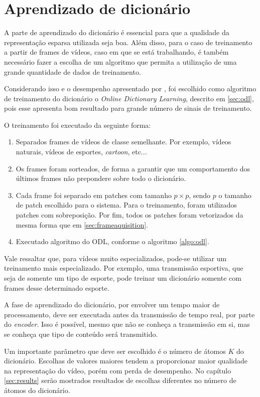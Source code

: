 \documentclass[cic,tc]{iiufrgs}
\begin{document}
\section{Aprendizado de dicionário}
\label{sec:learn}
A parte de aprendizado do dicionário é essencial para que a qualidade da representação
esparsa utilizada seja boa.
Além disso, para o caso de treinamento a partir de frames de vídeos, caso em que se está
trabalhando, é também necessário fazer a escolha de um algoritmo que permita a utilização
de uma grande quantidade de dados de treinamento.

Considerando isso e o desempenho apresentado por \citet{MairalOnlineDictLearn}, foi escolhido
como algoritmo de treinamento do dicionário o \textit{Online Dictionary Learning},
descrito em \autoref{sec:odl},
pois esse apresenta bom resultado para grande número de sinais de treinamento.

O treinamento foi executado da seguinte forma:
\begin{enumerate}
    \item Separados frames de vídeos de classe semelhante. Por exemplo, vídeos naturais, vídeos
    de esportes, \textit{cartoon}, etc...
    \item Os frames foram sorteados, de forma a garantir que um comportamento dos últimos frames
    não prepondere sobre todo o dicionário.
    \item Cada frame foi separado em patches com tamanho $p \times p$, sendo $p$ o tamanho de
    patch escolhido para o sistema.
    Para o treinamento, foram utilizados patches com sobreposição. Por fim, todos os patches
    foram vetorizados da mesma forma que em \autoref{sec:frameaquisition}.
    \item Executado algoritmo do ODL, conforme o algoritmo \ref{algo:odl}.
\end{enumerate}

Vale ressaltar que, para vídeos muito especializados, pode-se utilizar um treinamento
mais especializado. Por exemplo, uma transmissão esportiva, que seja de somente um tipo
de esporte, pode treinar um dicionário somente com frames desse determinado esporte.

A fase de aprendizado do dicionário, por envolver um tempo maior de processamento,
deve ser executada antes da transmissão de tempo real, por parte do \textit{encoder}.
Isso é possível, mesmo que não
se conheça a transmissão em si, mas se conheça que tipo de conteúdo será transmitido.

Um importante parâmetro que deve ser escolhido é o número de átomos $K$ do dicionário.
Escolhas de valores maiores tendem a proporcionar maior qualidade na representação do vídeo,
porém com perda de desempenho. No capítulo \ref{sec:results} serão mostrados resultados
de escolhas diferentes no número de átomos do dicionário.
\end{document}
